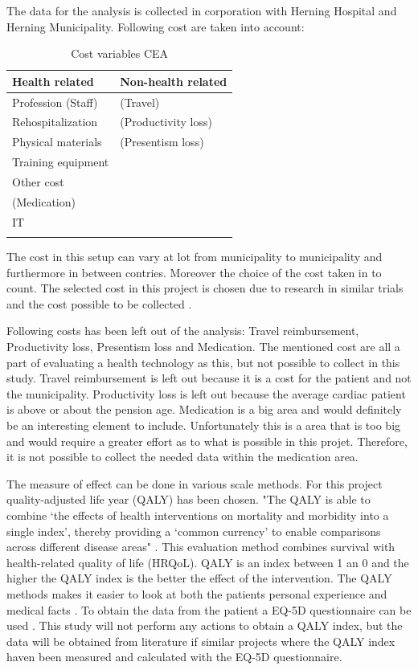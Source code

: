 The data for the analysis is collected in corporation with Herning Hospital and Herning Municipality. 
Following cost are taken into account:


\begin{longtabu} to 
	\textbf{Health related} & \textbf{Non-health related}\\[-1ex]
	\midrule
	Profession (Staff) & (Travel) \\[-1ex]
	Rehospitalization & (Productivity loss) \\[-1ex]
	Physical materials & (Presentism loss)\\[-1ex]
	Training equipment &  \\[-1ex]
	Other cost &  \\[-1ex]
	(Medication) &  \\[-1ex]
	IT &  \\[-1ex]
	\hline
	\caption{Cost variables CEA}
\end{longtabu}

The cost in this setup can vary at lot from municipality to municipality and furthermore in between contries. Moreover the choice of the cost taken in to count. The selected cost in this project is chosen due to research in similar trials and the cost possible to be collected \cite{costeffect, usingeffect}. 

Following costs has been left out of the analysis: Travel reimbursement, Productivity loss, Presentism loss and Medication. The mentioned cost are all a part of evaluating a health technology as this, but not possible to collect in this study. Travel reimbursement is left out because it is a cost for the patient and not the municipality. Productivity loss is left out because the average cardiac patient is above or about the pension age. Medication is a big area and would definitely be an interesting element to include. Unfortunately this is a area that is too big and would require a greater effort as to what is possible in this projet. Therefore, it is not possible to collect the needed data within the medication area. 

The measure of effect can be done in various scale methods. For this project quality-adjusted life year (QALY) has been chosen. "The QALY is able to combine ‘the effects of health interventions on mortality and morbidity into a single index’, thereby providing a ‘common currency’ to enable comparisons across different disease areas" \cite{QALY}. This evaluation method combines survival with health-related quality of life (HRQoL). QALY is an index between 1 an 0 and the higher the QALY index is the better the effect of the intervention. The QALY methods makes it easier to look at both the patients personal experience and medical facts \cite{QALY}. To obtain the data from the patient a EQ-5D questionnaire can be used \cite{costeffect}. This study will not perform any actions to obtain a QALY index, but the data will be obtained from literature if similar projects where the QALY index haven been measured and calculated with the EQ-5D questionnaire.


